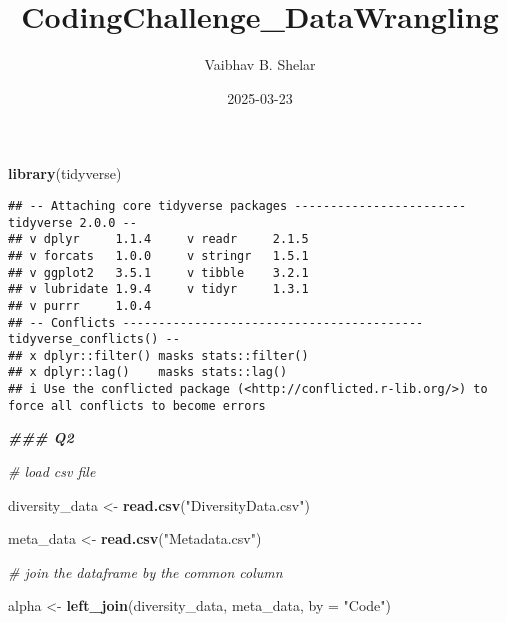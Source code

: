 \documentclass[
]{article}
\title{CodingChallenge\_DataWrangling}
\author{Vaibhav B. Shelar}
\date{2025-03-23}
\newenvironment{Shaded}{\begin{snugshade}}{\end{snugshade}}
\newcommand{\AttributeTok}[1]{\textcolor[rgb]{0.13,0.29,0.53}{#1}}
\newcommand{\CommentTok}[1]{\textcolor[rgb]{0.56,0.35,0.01}{\textit{#1}}}
\newcommand{\DocumentationTok}[1]{\textcolor[rgb]{0.56,0.35,0.01}{\textbf{\textit{#1}}}}
\newcommand{\FunctionTok}[1]{\textcolor[rgb]{0.13,0.29,0.53}{\textbf{#1}}}
\newcommand{\NormalTok}[1]{#1}
\newcommand{\OtherTok}[1]{\textcolor[rgb]{0.56,0.35,0.01}{#1}}
\newcommand{\StringTok}[1]{\textcolor[rgb]{0.31,0.60,0.02}{#1}}
\begin{document}
\maketitle

\begin{Shaded}
\begin{Highlighting}[]
\FunctionTok{library}\NormalTok{(tidyverse)}
\end{Highlighting}
\end{Shaded}

\begin{verbatim}
## -- Attaching core tidyverse packages ------------------------ tidyverse 2.0.0 --
## v dplyr     1.1.4     v readr     2.1.5
## v forcats   1.0.0     v stringr   1.5.1
## v ggplot2   3.5.1     v tibble    3.2.1
## v lubridate 1.9.4     v tidyr     1.3.1
## v purrr     1.0.4     
## -- Conflicts ------------------------------------------ tidyverse_conflicts() --
## x dplyr::filter() masks stats::filter()
## x dplyr::lag()    masks stats::lag()
## i Use the conflicted package (<http://conflicted.r-lib.org/>) to force all conflicts to become errors
\end{verbatim}

\begin{Shaded}
\begin{Highlighting}[]
\DocumentationTok{\#\#\# Q2}

\CommentTok{\# load csv file}

\NormalTok{diversity\_data }\OtherTok{\textless{}{-}} \FunctionTok{read.csv}\NormalTok{(}\StringTok{"DiversityData.csv"}\NormalTok{)}

\NormalTok{meta\_data }\OtherTok{\textless{}{-}} \FunctionTok{read.csv}\NormalTok{(}\StringTok{"Metadata.csv"}\NormalTok{)}

\CommentTok{\# join the dataframe by the common column}

\NormalTok{alpha }\OtherTok{\textless{}{-}} \FunctionTok{left\_join}\NormalTok{(diversity\_data, meta\_data, }\AttributeTok{by =} \StringTok{"Code"}\NormalTok{)}
\end{Highlighting}
\end{Shaded}
\end{document}
